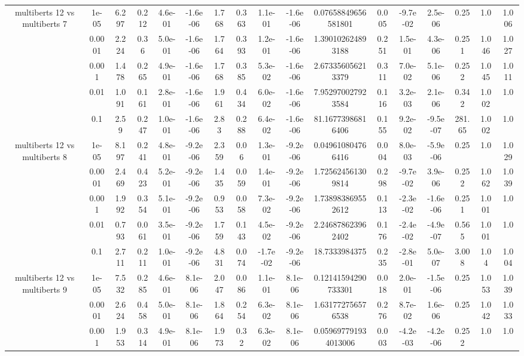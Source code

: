 \begin{tabular}{|c|c|c|c|c|c|c|c|c|c|c|c|c|c|c|c|c|}
\hline
\multirow{5}{*}{multiberts 12 vs multiberts 7} & 1e-05 & 6.297 & 0.212 & 4.6e-01 & -1.6e-06 & 1.768 & 0.363 & 1.1e-01 & -1.6e-06 & 0.07658849656581801 & 0.005 & -9.7e-02 & 2.5e-06 & 0.25 & 1.0 & 1.006 \\
 & 0.0001 & 2.224 & 0.36 & 5.0e-01 & -1.6e-06 & 1.764 & 0.393 & 1.2e-01 & -1.6e-06 & 1.390102624893188 & 0.251 & 1.5e-01 & 4.3e-06 & 0.251 & 1.046 & 1.027 \\
 & 0.001 & 1.478 & 0.265 & 4.9e-01 & -1.6e-06 & 1.768 & 0.385 & 5.3e-02 & -1.6e-06 & 2.673356056213379 & 0.311 & 7.0e-02 & 5.1e-06 & 0.252 & 1.045 & 1.011 \\
 & 0.01 & 1.091 & 0.161 & 2.8e-01 & -1.6e-06 & 1.961 & 0.434 & 6.0e-02 & -1.6e-06 & 7.952970027923584 & 0.116 & 3.2e-03 & 2.1e-06 & 0.342 & 1.002 & 1.0 \\
 & 0.1 & 2.59 & 0.247 & 1.0e-01 & -1.6e-06 & 2.83 & 0.288 & 6.4e-02 & -1.6e-06 & 81.16773986816406 & 0.155 & 9.2e-02 & -9.5e-07 & 281.65 & 1.002 & 1.0 \\
\hline
\multirow{5}{*}{multiberts 12 vs multiberts 8} & 1e-05 & 8.197 & 0.241 & 4.8e-01 & -9.2e-06 & 2.359 & 0.06 & 1.3e-01 & -9.2e-06 & 0.049610804766416 & 0.004 & 8.0e-03 & -5.9e-06 & 0.25 & 1.0 & 1.029 \\
 & 0.0001 & 2.469 & 0.423 & 5.2e-01 & -9.2e-06 & 1.435 & 0.059 & 1.4e-01 & -9.2e-06 & 1.725624561309814 & 0.298 & -9.7e-02 & 3.9e-06 & 0.252 & 1.062 & 1.039 \\
 & 0.001 & 1.992 & 0.354 & 5.1e-01 & -9.2e-06 & 0.953 & 0.058 & 7.3e-02 & -9.2e-06 & 1.738983869552612 & 0.113 & -2.3e-02 & -1.6e-06 & 0.251 & 1.001 & 1.0 \\
 & 0.01 & 0.793 & 0.061 & 3.5e-01 & -9.2e-06 & 1.759 & 0.143 & 4.5e-02 & -9.2e-06 & 2.246878623962402 & 0.176 & -2.4e-02 & -4.9e-07 & 0.565 & 1.001 & 1.0 \\
 & 0.1 & 2.711 & 0.211 & 1.0e-01 & -9.2e-06 & 4.831 & 0.074 & -1.7e-02 & -9.2e-06 & 18.7333984375 & 0.235 & -2.8e-01 & 5.0e-07 & 3.008 & 1.04 & 1.004 \\
\hline
\multirow{5}{*}{multiberts 12 vs multiberts 9} & 1e-05 & 7.532 & 0.285 & 4.6e-01 & 8.1e-06 & 2.047 & 0.086 & 1.1e-01 & 8.1e-06 & 0.12141594290733301 & 0.018 & 2.0e-01 & -1.5e-06 & 0.25 & 1.053 & 1.039 \\
 & 0.0001 & 2.624 & 0.458 & 5.0e-01 & 8.1e-06 & 1.864 & 0.254 & 6.3e-02 & 8.1e-06 & 1.631772756576538 & 0.276 & 8.7e-02 & 1.6e-06 & 0.25 & 1.042 & 1.033 \\
 & 0.001 & 1.953 & 0.314 & 4.9e-01 & 8.1e-06 & 1.973 & 0.32 & 6.3e-02 & 8.1e-06 & 0.059697791934013006 & 0.003 & -4.2e-03 & -4.2e-06 & 0.252 & 1.0 & 1.0 \\

\end{tabular}
